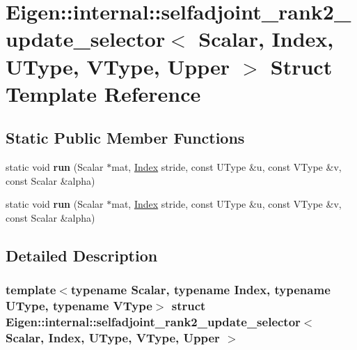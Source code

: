 \hypertarget{struct_eigen_1_1internal_1_1selfadjoint__rank2__update__selector_3_01_scalar_00_01_index_00_01_uf7a068ce7ab78b9bb81bd0ca858e99d2}{}\section{Eigen\+:\+:internal\+:\+:selfadjoint\+\_\+rank2\+\_\+update\+\_\+selector$<$ Scalar, Index, U\+Type, V\+Type, Upper $>$ Struct Template Reference}
\label{struct_eigen_1_1internal_1_1selfadjoint__rank2__update__selector_3_01_scalar_00_01_index_00_01_uf7a068ce7ab78b9bb81bd0ca858e99d2}
\subsection*{Static Public Member Functions}
\begin{DoxyCompactItemize}
\item 
\mbox{\label{struct_eigen_1_1internal_1_1selfadjoint__rank2__update__selector_3_01_scalar_00_01_index_00_01_uf7a068ce7ab78b9bb81bd0ca858e99d2_a3e300809989bb33416ab62cd52795709}} 
static void {\bfseries run} (Scalar $\ast$mat, \hyperlink{namespace_eigen_a62e77e0933482dafde8fe197d9a2cfde}{Index} stride, const U\+Type \&u, const V\+Type \&v, const Scalar \&alpha)
\item 
\mbox{\label{struct_eigen_1_1internal_1_1selfadjoint__rank2__update__selector_3_01_scalar_00_01_index_00_01_uf7a068ce7ab78b9bb81bd0ca858e99d2_a3e300809989bb33416ab62cd52795709}} 
static void {\bfseries run} (Scalar $\ast$mat, \hyperlink{namespace_eigen_a62e77e0933482dafde8fe197d9a2cfde}{Index} stride, const U\+Type \&u, const V\+Type \&v, const Scalar \&alpha)
\end{DoxyCompactItemize}


\subsection{Detailed Description}
\subsubsection*{template$<$typename Scalar, typename Index, typename U\+Type, typename V\+Type$>$\newline
struct Eigen\+::internal\+::selfadjoint\+\_\+rank2\+\_\+update\+\_\+selector$<$ Scalar, Index, U\+Type, V\+Type, Upper $>$}



